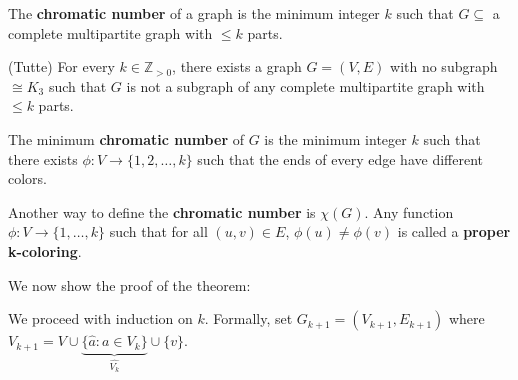 
\begin{definition}
	The \textbf{chromatic number} of a graph is the minimum integer \( k \) such that \( G \subseteq  \) a complete multipartite graph with \( \le k \) parts.
\end{definition}

\begin{theorem}
	(Tutte) For every \( k \in \mathbb{Z}_{>0} \), there exists a graph \( G=(V,E) \) with no subgraph \( \cong K_3 \) such that \( G \) is not a subgraph of any complete multipartite graph with \( \le k \) parts.
\end{theorem}

\begin{lemma}
	The minimum \textbf{chromatic number} of \( G \) is the minimum integer \( k \) such that there exists \( \phi : V \to \{1, 2, \ldots , k\}   \) such that the ends of every edge have different colors.
\end{lemma}

\begin{definition}
	Another way to define the \textbf{chromatic number} is \( \chi(G) \). Any function \(\phi :V \to \{1, \ldots , k\}   \) such that for all \( (u, v) \in E \), \( \phi (u) \neq  \phi (v) \) is called a \textbf{proper k-coloring}.
\end{definition}

We now show the proof of the theorem:
\begin{replacementproof}
	We proceed with induction on \( k \). Formally, set \( G_{k+1} = (V_{k+1}, E_{k+1}) \) where \( V_{k+1} = V \cup \underbrace{\{\hat{a} : a \in V_k\}}_{\hat{V_k}}  \cup \{v\}    \).
\end{replacementproof}
